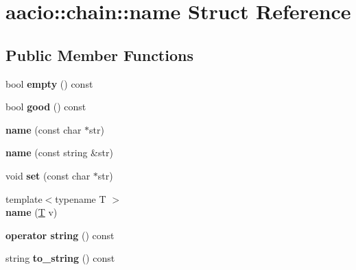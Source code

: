 \hypertarget{structaacio_1_1chain_1_1name}{}\section{aacio\+:\+:chain\+:\+:name Struct Reference}
\label{structaacio_1_1chain_1_1name}
\subsection*{Public Member Functions}
\begin{DoxyCompactItemize}
\item 
\mbox{\label{structaacio_1_1chain_1_1name_a39ed00a6b77165a83dd129edb5a27f1e}} 
bool {\bfseries empty} () const
\item 
\mbox{\label{structaacio_1_1chain_1_1name_a0b073ce0c145d2d7fa9879ef7ea007a4}} 
bool {\bfseries good} () const
\item 
\mbox{\label{structaacio_1_1chain_1_1name_a9436bf6d65ec3803717afabaef12f61a}} 
{\bfseries name} (const char $\ast$str)
\item 
\mbox{\label{structaacio_1_1chain_1_1name_a604c24601b790649fb1347ea0cb5049d}} 
{\bfseries name} (const string \&str)
\item 
\mbox{\label{structaacio_1_1chain_1_1name_ad77a19bfd2643372437673b2c948df3c}} 
void {\bfseries set} (const char $\ast$str)
\item 
\mbox{\label{structaacio_1_1chain_1_1name_a47c6a3f953d17ce27315042052e4c98b}} 
{\footnotesize template$<$typename T $>$ }\\{\bfseries name} (\mbox{\hyperlink{struct_t}{T}} v)
\item 
\mbox{\label{structaacio_1_1chain_1_1name_a36e1530fa2c7eca90fb3981b7ed96530}} 
{\bfseries operator string} () const
\item 
\mbox{\label{structaacio_1_1chain_1_1name_add9d2317f1c9352987dd84dac54411c0}} 
string {\bfseries to\+\_\+string} () const

\end{DoxyCompactItemize}
